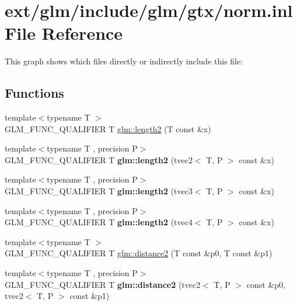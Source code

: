 \hypertarget{norm_8inl}{\section{ext/glm/include/glm/gtx/norm.inl File Reference}
\label{norm_8inl}
}
This graph shows which files directly or indirectly include this file\-:
\subsection*{Functions}
\begin{DoxyCompactItemize}
\item 
{\footnotesize template$<$typename T $>$ }\\G\-L\-M\-\_\-\-F\-U\-N\-C\-\_\-\-Q\-U\-A\-L\-I\-F\-I\-E\-R T \hyperlink{group__gtx__norm_ga08c670024cd230e22f8b853f185ff533}{glm\-::length2} (T const \&x)
\item 
\hypertarget{namespaceglm_a875e151c20a62ae94040a751a54f3aa4}{{\footnotesize template$<$typename T , precision P$>$ }\\G\-L\-M\-\_\-\-F\-U\-N\-C\-\_\-\-Q\-U\-A\-L\-I\-F\-I\-E\-R T {\bfseries glm\-::length2} (tvec2$<$ T, P $>$ const \&x)}\label{namespaceglm_a875e151c20a62ae94040a751a54f3aa4}

\item 
\hypertarget{namespaceglm_a4cbd4c83d9779038e8f2ad4adc2020b8}{{\footnotesize template$<$typename T , precision P$>$ }\\G\-L\-M\-\_\-\-F\-U\-N\-C\-\_\-\-Q\-U\-A\-L\-I\-F\-I\-E\-R T {\bfseries glm\-::length2} (tvec3$<$ T, P $>$ const \&x)}\label{namespaceglm_a4cbd4c83d9779038e8f2ad4adc2020b8}

\item 
\hypertarget{namespaceglm_a7bdb6f10f4951764181793679d4f16a8}{{\footnotesize template$<$typename T , precision P$>$ }\\G\-L\-M\-\_\-\-F\-U\-N\-C\-\_\-\-Q\-U\-A\-L\-I\-F\-I\-E\-R T {\bfseries glm\-::length2} (tvec4$<$ T, P $>$ const \&x)}\label{namespaceglm_a7bdb6f10f4951764181793679d4f16a8}

\item 
{\footnotesize template$<$typename T $>$ }\\G\-L\-M\-\_\-\-F\-U\-N\-C\-\_\-\-Q\-U\-A\-L\-I\-F\-I\-E\-R T \hyperlink{group__gtx__norm_ga3544f6288d3bce2cf2a9f6ebe39e0557}{glm\-::distance2} (T const \&p0, T const \&p1)
\item 
\hypertarget{namespaceglm_a96912f40056fa526cc78cbed19ef2a78}{{\footnotesize template$<$typename T , precision P$>$ }\\G\-L\-M\-\_\-\-F\-U\-N\-C\-\_\-\-Q\-U\-A\-L\-I\-F\-I\-E\-R T {\bfseries glm\-::distance2} (tvec2$<$ T, P $>$ const \&p0, tvec2$<$ T, P $>$ const \&p1)}\label{namespaceglm_a96912f40056fa526cc78cbed19ef2a78}


\end{DoxyCompactItemize}
